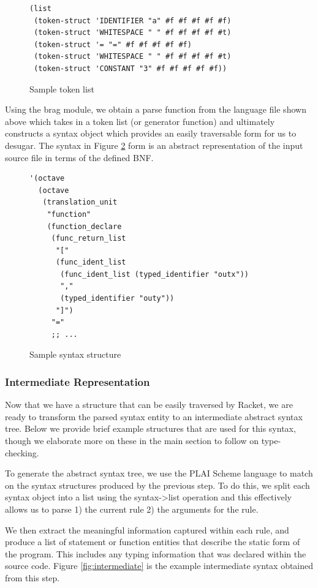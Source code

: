 \begin{figure}[h]
    \begin{lstlisting}[language=racket]
(list
 (token-struct 'IDENTIFIER "a" #f #f #f #f #f)
 (token-struct 'WHITESPACE " " #f #f #f #f #t)
 (token-struct '= "=" #f #f #f #f #f)
 (token-struct 'WHITESPACE " " #f #f #f #f #t)
 (token-struct 'CONSTANT "3" #f #f #f #f #f))
    \end{lstlisting}
    \caption[]{Sample token list}
    \label{fig:token}
\end{figure}

Using the brag module, we obtain a parse function from the language file shown above which takes in a token list (or generator function) and ultimately constructs a syntax object \cite{racketstxobj} which provides an easily traversable form for us to desugar. The syntax in Figure \ref{fig:syntax} form is an abstract representation of the input source file in terms of the defined BNF. 

\begin{figure}[h]
    \begin{lstlisting}[language=racket]
'(octave
  (octave
   (translation_unit
    "function"
    (function_declare
     (func_return_list
      "["
      (func_ident_list
       (func_ident_list (typed_identifier "outx"))
       ","
       (typed_identifier "outy"))
      "]")
     "="
     ;; ...
    \end{lstlisting}
    \caption[]{Sample syntax structure}
    \label{fig:syntax}
\end{figure}

\subsubsection{Intermediate Representation}
Now that we have a structure that can be easily traversed by Racket, we are ready to transform the parsed syntax entity to an intermediate abstract syntax tree. Below we provide brief example structures that are used for this syntax, though we elaborate more on these in the main section to follow on type-checking.

To generate the abstract syntax tree, we use the PLAI Scheme language \cite{plaischeme} to match on the syntax structures produced by the previous step. To do this, we split each syntax object into a list using the syntax->list operation and this effectively allows us to parse 1) the current rule 2) the arguments for the rule.

We then extract the meaningful information captured within each rule, and produce a list of statement or function entities that describe the static form of the program. This includes any typing information that was declared within the source code. Figure \ref{fig:intermediate} is the example intermediate syntax obtained from this step.

